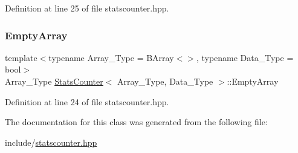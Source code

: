 Definition at line 25 of file statscounter.\+hpp.

\mbox{\label{class_stats_counter_a026304bec607994865ba5bb4e18f9104}} 
\subsubsection{\texorpdfstring{Empty\+Array}{EmptyArray}}
{\footnotesize\ttfamily template$<$typename Array\+\_\+\+Type = B\+Array$<$$>$, typename Data\+\_\+\+Type = bool$>$ \\
Array\+\_\+\+Type \hyperlink{class_stats_counter}{Stats\+Counter}$<$ Array\+\_\+\+Type, Data\+\_\+\+Type $>$\+::Empty\+Array}



Definition at line 24 of file statscounter.\+hpp.



The documentation for this class was generated from the following file\+:\begin{DoxyCompactItemize}
\item 
include/\hyperlink{statscounter_8hpp}{statscounter.\+hpp}\end{DoxyCompactItemize}
